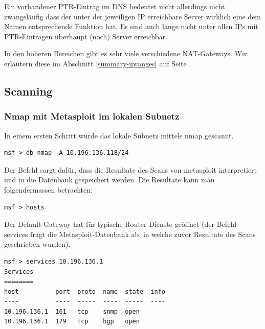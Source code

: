 \documentclass[a4paper,11pt]{scrartcl}
\begin{document}
Ein vorhandener PTR-Eintrag im DNS bedeutet nicht allerdings nicht zwangsläufig dass der unter der jeweiligen IP erreichbare Server wirklich eine dem Namen entsprechende Funktion hat. Es sind auch lange nicht unter allen IPs mit PTR-Einträgen überhaupt (noch) Server erreichbar.

In den höheren Bereichen gibt es sehr viele verschiedene NAT-Gateways. Wir erläutern diese im Abschnitt \ref{summary-ipranges} auf Seite \pageref{summary-ipranges}.

\FloatBarrier
\subsection{Scanning}
\subsubsection{Nmap mit Metasploit im lokalen Subnetz}
In einem ersten Schritt wurde das lokale Subnetz mittels nmap gescannt.
\begin{verbatim}msf > db_nmap -A 10.196.136.118/24\end{verbatim}
Der Befehl sorgt dafür, dass die Resultate des Scans von metasploit interpretiert und in die Datenbank gespeichert werden. Die Resultate kann man folgendermassen betrachten:
\begin{verbatim}msf > hosts\end{verbatim}

Der Default-Gateway hat für typische Router-Dienste geöffnet (der Befehl services fragt die Metasploit-Datenbank ab, in welche zuvor Resultate des Scans geschrieben wurden).
\begin{lstlisting}
msf > services 10.196.136.1
Services
========
host          port  proto  name  state  info
----          ----  -----  ----  -----  ----
10.196.136.1  161   tcp    snmp  open   
10.196.136.1  179   tcp    bgp   open
\end{lstlisting}
\end{document}
